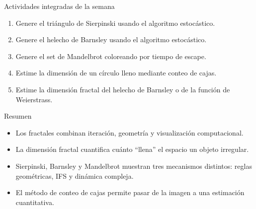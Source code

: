 \begin{frame}{Actividades integradas de la semana}
\begin{enumerate}
    \item[(a)] Genere el triángulo de Sierpinski usando el algoritmo estocástico.
    \item[(b)] Genere el helecho de Barnsley usando el algoritmo estocástico.
    \item[(c)] Genere el set de Mandelbrot coloreando por tiempo de escape.
    \item[(d)] Estime la dimensión de un círculo lleno mediante conteo de cajas.
    \item[(e)] Estime la dimensión fractal del helecho de Barnsley o de la función de Weierstrass.
\end{enumerate}

\end{frame}

\begin{frame}{Resumen}
\begin{itemize}
    \item Los fractales combinan iteración, geometría y visualización computacional.
    \item La dimensión fractal cuantifica cuánto ``llena'' el espacio un objeto irregular.
    \item Sierpinski, Barnsley y Mandelbrot muestran tres mecanismos distintos: reglas geométricas, IFS y dinámica compleja.
    \item El método de conteo de cajas permite pasar de la imagen a una estimación cuantitativa.
\end{itemize}
\end{frame}



